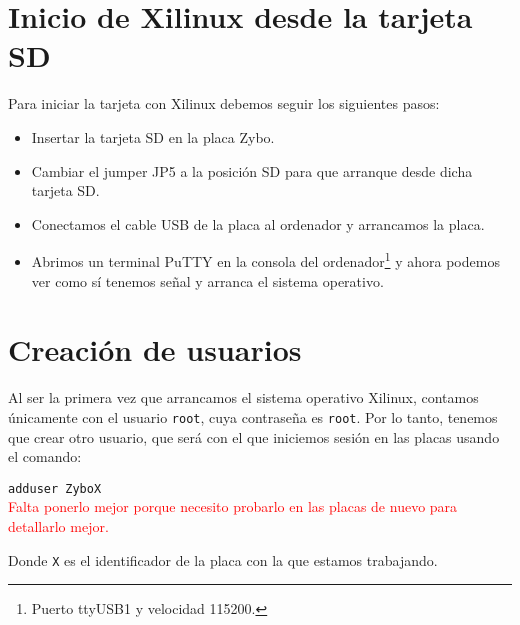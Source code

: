 \documentclass[12pt,letterpaper]{article}
\begin{document}
\section{Inicio de Xilinux desde la tarjeta SD}
Para iniciar la tarjeta con Xilinux debemos seguir los siguientes pasos:
\begin{itemize}
	\item Insertar la tarjeta SD en la placa Zybo.
	\item Cambiar el jumper JP5 a la posición SD para que arranque desde dicha tarjeta SD.
	\item Conectamos el cable USB de la placa al ordenador y arrancamos la placa.
	\item Abrimos un terminal PuTTY en la consola del ordenador\footnote{Puerto ttyUSB1 y velocidad 115200.} y ahora podemos ver como sí tenemos señal y arranca el sistema operativo.
\end{itemize}

\section{Creación de usuarios}
Al ser la primera vez que arrancamos el sistema operativo Xilinux, contamos únicamente con el usuario \texttt{root}, cuya contraseña es \texttt{root}. Por lo tanto, tenemos que crear otro usuario, que será con el que iniciemos sesión en las placas usando el comando:
\begin{center}
	\texttt{adduser ZyboX}
	\\\textcolor{red}{Falta ponerlo mejor porque necesito probarlo en las placas de nuevo para detallarlo mejor.}
\end{center}
Donde \texttt{X} es el identificador de la placa con la que estamos trabajando.
\end{document}
